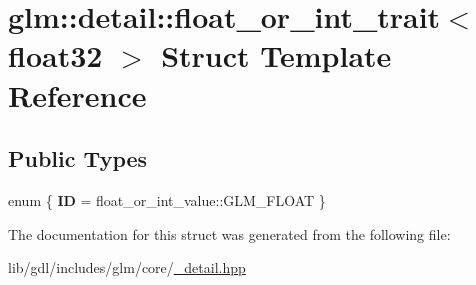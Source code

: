\hypertarget{structglm_1_1detail_1_1float__or__int__trait_3_01float32_01_4}{}\section{glm\+:\+:detail\+:\+:float\+\_\+or\+\_\+int\+\_\+trait$<$ float32 $>$ Struct Template Reference}
\label{structglm_1_1detail_1_1float__or__int__trait_3_01float32_01_4}
\subsection*{Public Types}
\begin{DoxyCompactItemize}
\item 
\hypertarget{structglm_1_1detail_1_1float__or__int__trait_3_01float32_01_4_a3366e811b683334ce53916541751af1f}{}enum \{ {\bfseries I\+D} = float\+\_\+or\+\_\+int\+\_\+value\+:\+:G\+L\+M\+\_\+\+F\+L\+O\+A\+T
 \}\label{structglm_1_1detail_1_1float__or__int__trait_3_01float32_01_4_a3366e811b683334ce53916541751af1f}

\end{DoxyCompactItemize}


The documentation for this struct was generated from the following file\+:\begin{DoxyCompactItemize}
\item 
lib/gdl/includes/glm/core/\hyperlink{__detail_8hpp}{\+\_\+detail.\+hpp}\end{DoxyCompactItemize}
